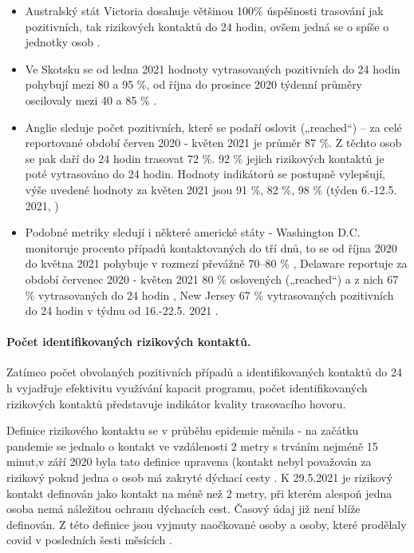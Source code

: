 \begin{itemize}
\item Australský stát Victoria dosahuje většinou 100\% úspěšnosti trasování jak pozitivních, tak rizikových kontaktů do 24 hodin, ovšem jedná se o spíše o jednotky osob \cite{tr_victoria}.
\item Ve Skotsku se od ledna 2021 hodnoty vytrasovaných pozitivních do 24 hodin pohybují mezi 80 a 95 \%, od října do prosince 2020 týdenní průměry oscilovaly mezi 40 a 85 \% \cite{tr_scotland}.
\item Anglie sleduje počet pozitivních, které se podaří oslovit („reached“) -- za celé reportované období červen 2020 - květen 2021 je průměr 87 \%. Z těchto osob se pak daří do 24 hodin trasovat 72 \%. 92 \% jejich rizikových kontaktů je poté vytrasováno do 24 hodin. Hodnoty indikátorů se postupně vylepšují, výše uvedené hodnoty za květen 2021 jsou 91 \%, 82 \%, 98 \% (týden 6.-12.5. 2021, \cite{tr_gov_uk03})
\item Podobné metriky sledují i některé americké státy - Washington D.C. monitoruje procento případů kontaktovaných do tří dnů, to se od října 2020 do května 2021 pohybuje v rozmezí převážně 70--80 \% \cite{tr_DC}, Delaware reportuje za období červenec 2020 - květen 2021 80 \% oslovených („reached“) a z nich 67 \% vytrasovaných do 24 hodin \cite{tr_Delaware}, New Jersey 67 \% vytrasovaných pozitivních do 24 hodin v týdnu od 16.-22.5. 2021 \cite{tr_NewJersey}.
\end{itemize}


\paragraph{Počet identifikovaných rizikových kontaktů.} Zatímco počet obvolaných pozitivních případů a identifikovaných kontaktů do 24 h vyjadřuje efektivitu využívání kapacit programu, počet identifikovaných rizikových kontaktů představuje indikátor kvality trasovacího hovoru.

Definice rizikového kontaktu se v průběhu epidemie měnila - na začátku pandemie se jednalo o kontakt ve vzdálenosti 2 metry s trváním nejméně 15 minut,v září 2020 byla tato definice upravena (kontakt nebyl považován za rizikový pokud jedna o osob má zakryté dýchací cesty \cite{tr_MZCR}. K 29.5.2021 je rizikový kontakt definován jako kontakt na méně než 2 metry, při kterém alespoň jedna osoba nemá náležitou ochranu dýchacích cest. Časový údaj již není blíže definován. Z této definice jsou vyjmuty naočkované osoby a osoby, které prodělaly covid v posledních šesti měsících \cite{tr_covidgov}.

